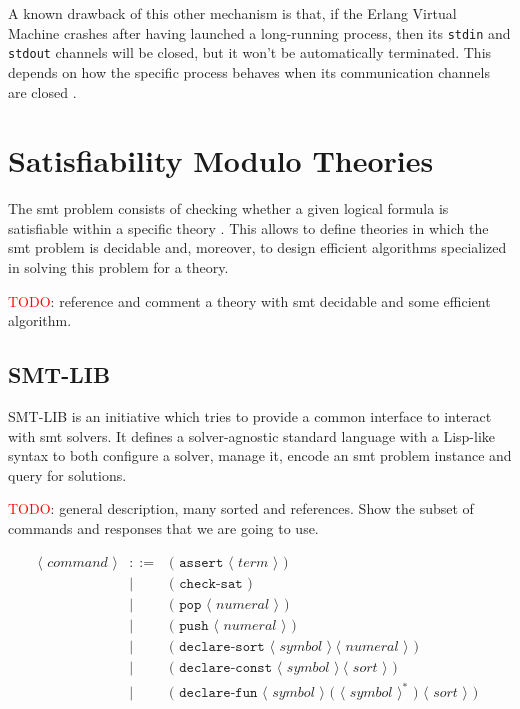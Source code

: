 A known drawback of this other mechanism is that, if the Erlang Virtual 
Machine crashes after having launched a long-running process, then its \verb|stdin| 
and \verb|stdout| channels will be closed, but it won't be automatically terminated.
This depends on how the specific process behaves when its communication channels are
closed \citep{ElixirDocs}.

\section{Satisfiability Modulo Theories}

The \gls{smt} problem consists of checking whether
a given logical formula is satisfiable within a specific theory
\citep{smtLibStandard}. This allows to define theories in which the \gls{smt} problem
is decidable and, moreover, to design efficient algorithms specialized in 
solving this problem for a theory.

\textcolor{red}{TODO}: reference and comment a theory with smt decidable and some 
efficient algorithm.

\subsection{SMT-LIB}
\label{prelim:smtlib}

SMT-LIB is an initiative which tries to provide a common interface to interact
with \acrshort{smt} solvers. It defines a solver-agnostic standard language
with a Lisp-like syntax to both configure a solver, manage it, encode an
\gls{smt} problem instance and query for solutions.

\textcolor{red}{TODO}: general description, many sorted and references. 
Show the subset of commands and responses that we are going to use.

\[
\begin{array}{rcll}
\langle\textit{ command }\rangle & ::= & \texttt{( assert } \langle\textit{ term }\rangle\texttt{ ) }\\
& | & \texttt{( check-sat )}\\
& | & \texttt{( pop } \langle\textit{ numeral }\rangle \texttt{ ) }\\
& | & \texttt{( push } \langle\textit{ numeral }\rangle \texttt{ ) }\\
& | & \texttt{( declare-sort } \langle\textit{ symbol }\rangle~\langle\textit{ numeral }\rangle\texttt{ ) }\\
& | & \texttt{( declare-const } \langle\textit{ symbol }\rangle~\langle\textit{ sort }\rangle\texttt{ ) }\\
& | & \texttt{( declare-fun } \langle\textit{ symbol }\rangle \texttt{ ( }\langle\textit{ symbol }\rangle^* \texttt{ ) }\langle\textit{ sort }\rangle\texttt{ ) }\\
\end{array}
\]

